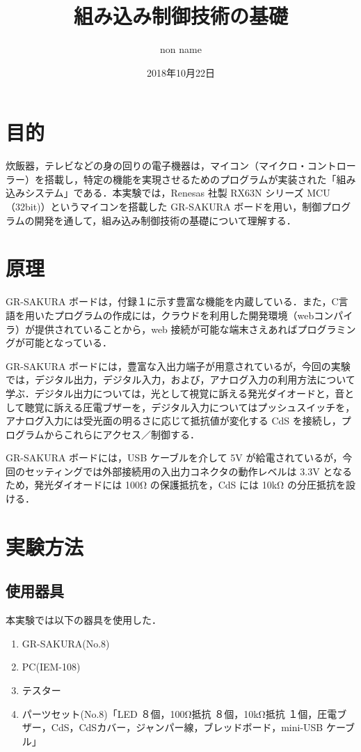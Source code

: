 \documentclass {ujarticle}
\title {組み込み制御技術の基礎}
\author{non name}
\date {2018年10月22日}
\begin{document}
\maketitle
\newpage

\section{目的}
炊飯器，テレビなどの身の回りの電子機器は，マイコン（マイクロ・コントローラー）を搭載し，特定の機能を実現させるためのプログラムが実装された「組み込みシステム」である．本実験では，Renesas 社製 RX63N シリーズ MCU（32bit)）というマイコンを搭載した GR-SAKURA ボードを用い，制御プログラムの開発を通して，組み込み制御技術の基礎について理解する．

 \section{原理}
 GR-SAKURA ボードは，付録１に示す豊富な機能を内蔵している．また，C言語を用いたプログラムの作成には，クラウドを利用した開発環境（webコンパイラ）が提供されていることから，web 接続が可能な端末さえあればプログラミングが可能となっている．
 
 GR-SAKURA ボードには，豊富な入出力端子が用意されているが，今回の実験では，デジタル出力，デジタル入力，および，アナログ入力の利用方法について学ぶ．デジタル出力については，光として視覚に訴える発光ダイオードと，音として聴覚に訴える圧電ブザーを，デジタル入力についてはプッシュスイッチを，アナログ入力には受光面の明るさに応じて抵抗値が変化する CdS を接続し，プログラムからこれらにアクセス／制御する．
 
 GR-SAKURA ボードには，USB ケーブルを介して 5V が給電されているが，今回のセッティングでは外部接続用の入出力コネクタの動作レベルは 3.3V となるため，発光ダイオードには 100Ω の保護抵抗を，CdS には 10kΩ の分圧抵抗を設ける．
 
 \section{実験方法}
 \subsection{使用器具}
 本実験では以下の器具を使用した．
 \begin{enumerate}
 \item GR-SAKURA(No.8)
 \item PC(IEM-108)
 \item テスター
 \item パーツセット(No.8)「LED ８個，100Ω抵抗 ８個，10kΩ抵抗 １個，圧電ブザー，CdS，CdSカバー，ジャンパー線，ブレッドボード，mini-USB ケーブル」
 \end{enumerate}
 
\end{document}
